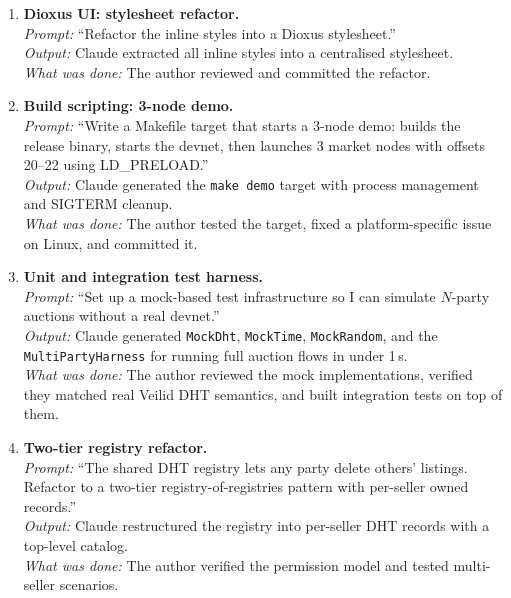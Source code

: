 \begin{enumerate}
  \item \textbf{Dioxus UI: stylesheet refactor.}\\
    \textit{Prompt:} ``Refactor the inline styles into a Dioxus
    stylesheet.''\\
    \textit{Output:} Claude extracted all inline styles into a
    centralised stylesheet.\\
    \textit{What was done:} The author reviewed and committed the
    refactor.

  \item \textbf{Build scripting: 3-node demo.}\\
    \textit{Prompt:} ``Write a Makefile target that starts a 3-node demo:
    builds the release binary, starts the devnet, then launches 3 market
    nodes with offsets 20--22 using LD\_PRELOAD.''\\
    \textit{Output:} Claude generated the \texttt{make demo} target
    with process management and SIGTERM cleanup.\\
    \textit{What was done:} The author tested the target, fixed a
    platform-specific issue on Linux, and committed it.

  \item \textbf{Unit and integration test harness.}\\
    \textit{Prompt:} ``Set up a mock-based test infrastructure so I can
    simulate $N$-party auctions without a real devnet.''\\
    \textit{Output:} Claude generated \texttt{MockDht},
    \texttt{MockTime}, \texttt{MockRandom}, and the
    \texttt{MultiPartyHarness} for running full auction flows in
    under 1\,s.\\
    \textit{What was done:} The author reviewed the mock implementations,
    verified they matched real Veilid DHT semantics, and built
    integration tests on top of them.

  \item \textbf{Two-tier registry refactor.}\\
    \textit{Prompt:} ``The shared DHT registry lets any party delete
    others' listings.  Refactor to a two-tier registry-of-registries
    pattern with per-seller owned records.''\\
    \textit{Output:} Claude restructured the registry into per-seller
    DHT records with a top-level catalog.\\
    \textit{What was done:} The author verified the permission model
    and tested multi-seller scenarios.


\end{enumerate}
